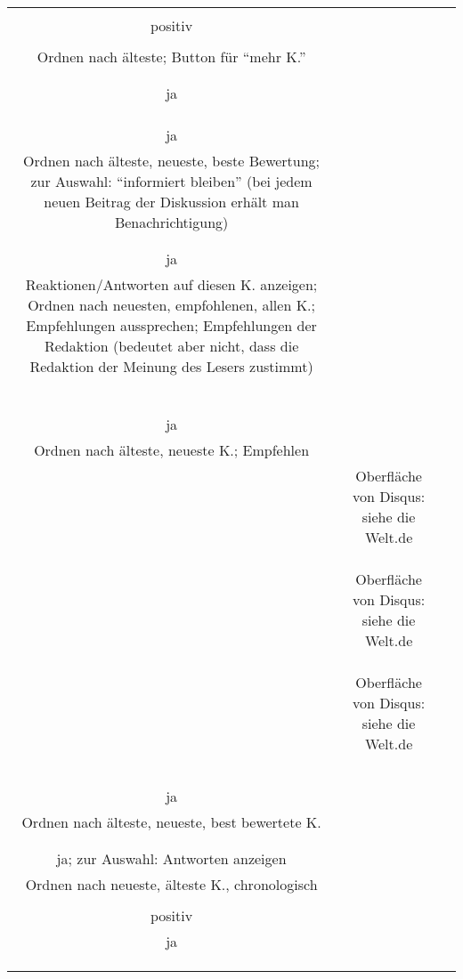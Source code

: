 \begin{landscape}
\begin{tabular}{ccc}
{		\\
		positiv\\
		\\
		Ordnen nach älteste; Button für ``mehr K.''\\
		\\
		\\
		ja\\
		\\
		&
		\\
		\\
		ja\\
		Ordnen nach älteste, neueste, beste Bewertung; zur Auswahl: ``informiert bleiben'' (bei jedem neuen Beitrag der Diskussion erhält man Benachrichtigung)\\
		&
		\\
		\\
		ja\\
		Reaktionen/Antworten auf diesen K. anzeigen; Ordnen nach neuesten, empfohlenen, allen K.; Empfehlungen aussprechen; Empfehlungen der Redaktion (bedeutet aber nicht, dass die Redaktion der Meinung des Lesers zustimmt)\\
		&
		\\
		\\
		\\
		\\
		&%
		\\
		\\
		ja\\
		Ordnen nach älteste, neueste K.; Empfehlen\\
		&%
		Oberfläche von Disqus: siehe die Welt.de\\
		\\
		\\
		\\
		&
		Oberfläche von Disqus: siehe die Welt.de\\
		\\
		\\
		\\
		&
		Oberfläche von Disqus: siehe die Welt.de\\
		\\
		\\
		\\
		&
		\\
		\\
		ja\\
		Ordnen nach älteste, neueste, best bewertete K.\\
		&
		\\
		\\
		ja; zur Auswahl: Antworten anzeigen\\
		Ordnen nach neueste, älteste K., chronologisch\\
		&
		\\
		positiv\\
		ja\\
		\\
		&
		\\ \hline
		
}
\end{tabular}
\end{landscape}

